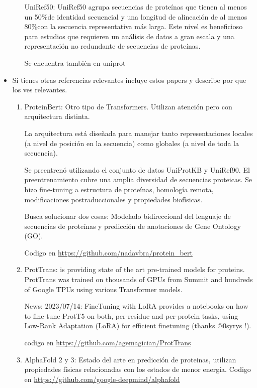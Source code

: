 \documentclass[11pt, twoside]{report}
\begin{document}
\begin{itemize}
\begin{enumerate}
        UniRef50: UniRef50 agrupa secuencias de proteínas que tienen al menos un 50$\% $de identidad secuencial y una longitud de alineación de al menos 80$\% $con la secuencia representativa más larga.  Este nivel es beneficioso para estudios que requieren un análisis de datos a gran escala y una representación no redundante de secuencias de proteínas.

        Se encuentra también en uniprot
    \end{enumerate}

    \item Si tienes otras referencias relevantes incluye estos papers y describe por que los ves relevantes.
    
    \begin{enumerate}
        \item ProteinBert: Otro tipo de Transformers. Utilizan atención pero con arquitectura distinta. 

        La arquitectura está diseñada para manejar tanto representaciones locales (a nivel de posición en la secuencia) como globales (a nivel de toda la secuencia).

        Se preentrenó utilizando el conjunto de datos UniProtKB y UniRef90. El preentrenamiento cubre una amplia diversidad de secuencias proteicas. Se hizo fine-tuning a estructura de proteínas, homología remota, modificaciones postraduccionales y propiedades biofísicas.

        Busca solucionar dos cosas: Modelado bidireccional del lenguaje de secuencias de proteínas y predicción de anotaciones de Gene Ontology (GO).
    

        Codigo en \url{https://github.com/nadavbra/protein_bert}


        \item ProtTrans: 
        is providing state of the art pre-trained models for proteins. ProtTrans was trained on thousands of GPUs from Summit and hundreds of Google TPUs using various Transformer models.

        News: 2023/07/14: FineTuning with LoRA provides a notebooks on how to fine-tune ProtT5 on both, per-residue and per-protein tasks, using Low-Rank Adaptation (LoRA) for efficient finetuning (thanks @0syrys !).


        codigo en \url{https://github.com/agemagician/ProtTrans}
    



        \item AlphaFold 2 y 3: Estado del arte en predicción de proteinas, utilizan propiedades físicas relacionadas con los estados de menor energía. Codigo en \url{https://github.com/google-deepmind/alphafold}
        

\end{enumerate}
\end{itemize}
\end{document}
